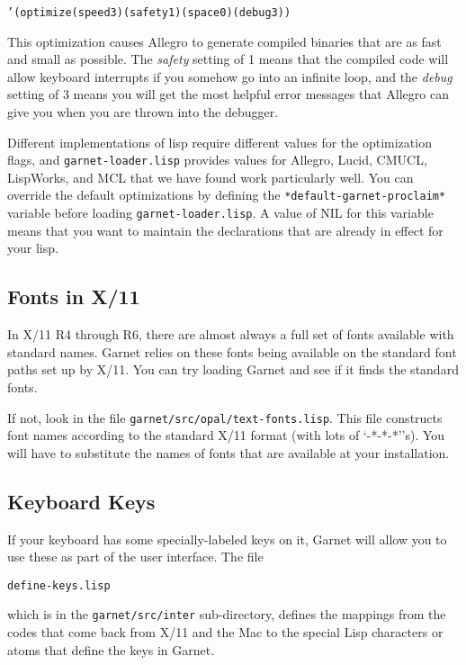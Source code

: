 \documentclass{report}
\newenvironment{programexample}{\begin{alltt}}{\end{alltt}}
\begin{document}
\begin{programexample}
  '(optimize (speed 3) (safety 1) (space 0) (debug 3))
\end{programexample}

This optimization causes Allegro to generate compiled binaries that
are as fast and small as possible.  The {\it safety} setting of 1
means that the compiled code will allow keyboard interrupts if you
somehow go into an infinite loop, and the {\it debug} setting of 3
means you will get the most helpful error messages that Allegro can
give you when you are thrown into the debugger.

Different implementations of lisp require different values for the
optimization flags, and \texttt{garnet-loader.lisp} provides values for
Allegro, Lucid, CMUCL, LispWorks, and MCL that we have found work
particularly well.  You can override the default optimizations by
defining the \texttt{*default-garnet-proclaim*} variable before loading
\texttt{garnet-loader.lisp}.  A value of NIL for this variable means that
you want to maintain the declarations that are already in effect for
your lisp.


\subsection{Fonts in X/11}
 

In X/11 R4 through R6, there are almost always a full set of fonts
available with standard names.  Garnet relies on these fonts being
available on the standard font paths set up by X/11.  You can try
loading Garnet and see if it finds the standard fonts.

If not, look in the file \texttt{garnet/src/opal/text-fonts.lisp}.  This
file constructs font names according to the standard X/11 format (with
lots of `-*-*-*''s).  You will have to substitute the names of fonts
that are available at your installation.

\subsection{Keyboard Keys}
 

If your keyboard has some specially-labeled keys on it, Garnet will
allow you to use these as part of the user interface.  The file
\begin{programexample}
  define-keys.lisp
\end{programexample}
which is in the \texttt{garnet/src/inter} sub-directory, defines the
mappings from the codes that come back from X/11 and the Mac to the
special Lisp characters or atoms that define the keys in Garnet.
\end{document}
